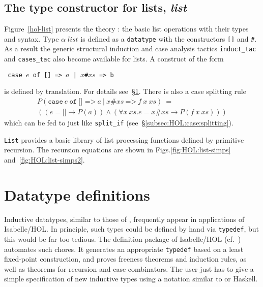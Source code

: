 \subsection{The type constructor for lists, \textit{list}}
\label{subsec:list}

Figure~\ref{hol-list} presents the theory : the basic list
operations with their types and syntax.  Type $\alpha \; list$ is
defined as a \texttt{datatype} with the constructors {\tt[]} and {\tt\#}.
As a result the generic structural induction and case analysis tactics
\texttt{induct\_tac} and \texttt{cases\_tac} also become available for
lists.  A  construct of the form
\begin{center}\tt
case $e$ of [] => $a$  |  \(x\)\#\(xs\) => b
\end{center}
is defined by translation.  For details see~{\S}\ref{sec:HOL:datatype}. There
is also a case splitting rule 
\[
\begin{array}{l}
P(\mathtt{case}~e~\mathtt{of}~\texttt{[] =>}~a ~\texttt{|}~
               x\texttt{\#}xs~\texttt{=>}~f~x~xs) ~= \\
((e = \texttt{[]} \to P(a)) \land
 (\forall x~ xs. e = x\texttt{\#}xs \to P(f~x~xs)))
\end{array}
\]
which can be fed to  just like
\texttt{split_if} (see~{\S}\ref{subsec:HOL:case:splitting}).

\texttt{List} provides a basic library of list processing functions defined by
primitive recursion.  The recursion equations
are shown in Figs.\ts\ref{fig:HOL:list-simps} and~\ref{fig:HOL:list-simps2}.



\section{Datatype definitions}
\label{sec:HOL:datatype}

Inductive datatypes, similar to those of \ML, frequently appear in
applications of Isabelle/HOL.  In principle, such types could be defined by
hand via \texttt{typedef}, but this would be far too
tedious.  The  definition package of Isabelle/HOL (cf.\ 
\cite{Berghofer-Wenzel:1999:TPHOL}) automates such chores.  It generates an
appropriate \texttt{typedef} based on a least fixed-point construction, and
proves freeness theorems and induction rules, as well as theorems for
recursion and case combinators.  The user just has to give a simple
specification of new inductive types using a notation similar to {\ML} or
Haskell.

